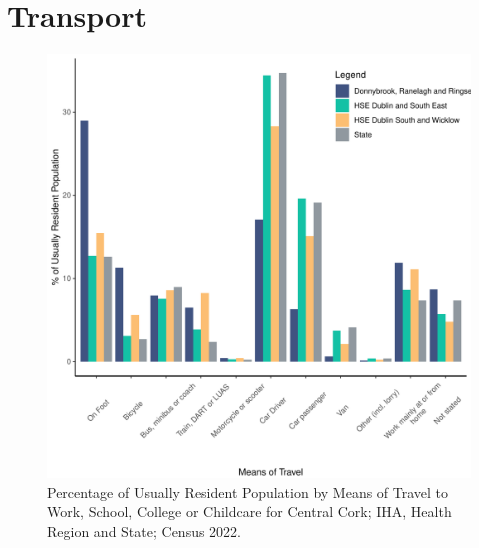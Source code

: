 \documentclass{article}
\begin{document}
\section{Transport}\label{sect:Trans}
\begin{figure}[H]
	\centering
	\includegraphics[width = 120mm]{../figures/TravelED.pdf}
	\caption{Percentage of Usually Resident Population by Means of Travel to Work, School, College or Childcare for Central Cork; IHA, Health Region and State; Census 2022.}
	\label{fig:vbnv}
	\end{figure}
\end{document}

